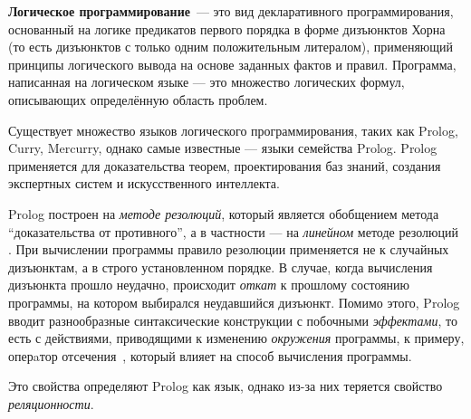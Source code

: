 {\bf Логическое программирование}~--- это вид декларативного программирования,
основанный на логике предикатов первого порядка в форме дизъюнктов Хорна (то есть дизъюнктов
с только одним положительным литералом),
применяющий принципы логического вывода на основе заданных фактов и правил.
Программа, написанная на логическом языке --- это множество логических формул,
описывающих определённую область проблем.\cite{logicMJ}

Существует множество языков логического программирования, таких как Prolog, Curry, Mercurry,
однако самые известные --- языки семейства Prolog. Prolog применяется для доказательства
теорем, проектирования баз знаний, создания экспертных систем и искусственного интеллекта.

Prolog построен на \emph{методе резолюций}, который является обобщением метода
``доказательства от противного'', а в частности --- на \emph{линейном} методе
резолюций .
При вычислении программы правило резолюции применяется не к случайных дизъюнктам,
а в строго установленном порядке. В случае, когда вычисления дизъюнкта прошло
неудачно, происходит \emph{откат} к прошлому состоянию программы, на котором
выбирался неудавшийся дизъюнкт\cite{logicMJ}.
Помимо этого, Prolog вводит разнообразные синтаксические конструкции с побочными \emph{эффектами},
то есть с действиями, приводящими к изменению \emph{окружения} программы,
к примеру, оперaтор отсечения~,
который влияет на способ вычисления программы.

Это свойства определяют Prolog как язык, однако из-за них теряется свойство \emph{реляционности}.

% 
% 
% 
